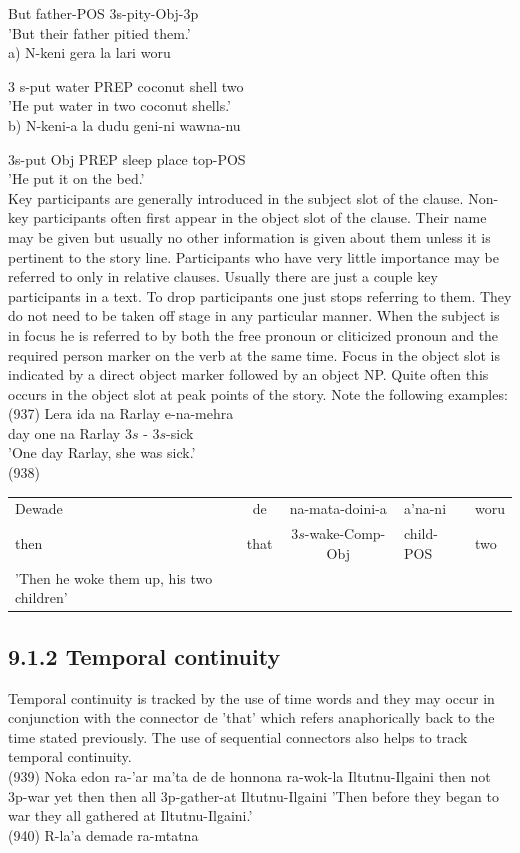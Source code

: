 \documentclass[10pt]{article}
\begin{document}
But father-POS 3s-pity-Obj-3p\\
'But their father pitied them.'\\
a) N-keni gera la lari woru

3 s-put water PREP coconut shell two\\
'He put water in two coconut shells.'\\
b) N-keni-a la dudu geni-ni wawna-nu

3s-put Obj PREP sleep place top-POS\\
'He put it on the bed.'\\
Key participants are generally introduced in the subject slot of the clause. Non-key participants often first appear in the object slot of the clause. Their name may be given but usually no other information is given about them unless it is pertinent to the story line. Participants who have very little importance may be referred to only in relative clauses. Usually there are just a couple key participants in a text. To drop participants one just stops referring to them. They do not need to be taken off stage in any particular manner. When the subject is in focus he is referred to by both the free pronoun or cliticized pronoun and the required person marker on the verb at the same time. Focus in the object slot is indicated by a direct object marker followed by an object NP. Quite often this occurs in the object slot at peak points of the story. Note the following examples:\\
(937) Lera ida na Rarlay e-na-mehra\\
day one na Rarlay \(3 s\) - \(3 s\)-sick\\
'One day Rarlay, she was sick.'\\
(938)

\begin{center}
\begin{tabular}{lccll}
Dewade & de & na-mata-doini-a & a'na-ni & woru \\
then & that & \(3 s\)-wake-Comp-Obj & child-POS & two \\
'Then he woke them up, his two children' &  &  &  &  \\
\end{tabular}
\end{center}

\subsection*{9.1.2 Temporal continuity}
Temporal continuity is tracked by the use of time words and they may occur in conjunction with the connector de 'that' which refers anaphorically back to the time stated previously. The use of sequential connectors also helps to track temporal continuity.\\
(939) Noka edon ra-'ar ma'ta de de honnona ra-wok-la Iltutnu-Ilgaini then not 3p-war yet then then all 3p-gather-at Iltutnu-Ilgaini 'Then before they began to war they all gathered at Iltutnu-Ilgaini.'\\
(940) R-la'a demade ra-mtatna
\end{document}
